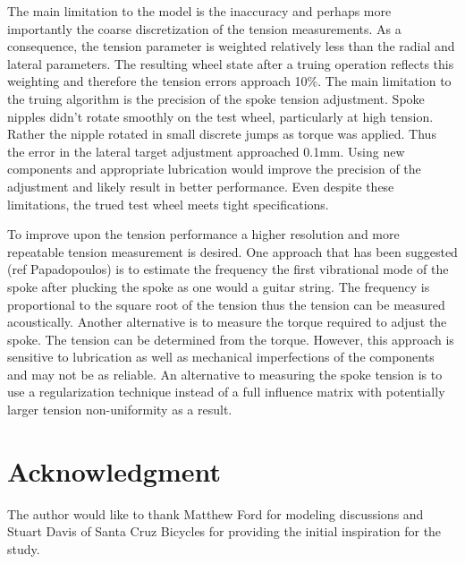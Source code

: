 \documentclass[journal]{IEEEtran}
\begin{document}
The main limitation to the model is the inaccuracy and perhaps more importantly the coarse discretization of the tension measurements.  As a consequence, the tension parameter is weighted relatively less than the radial and lateral parameters.  The resulting wheel state after a truing operation reflects this weighting and therefore the tension errors approach 10\%. The main limitation to the truing algorithm is the precision of the spoke tension adjustment. Spoke nipples didn't rotate smoothly on the test wheel, particularly at high tension.  Rather the nipple rotated in small discrete jumps as torque was applied.  Thus the error in the lateral target adjustment approached 0.1mm.  Using new components and appropriate lubrication would improve the precision of the adjustment and likely result in better performance.  Even despite these limitations, the trued test wheel meets tight specifications.

To improve upon the tension performance a higher resolution and more repeatable tension measurement is desired. One approach that has been suggested (ref Papadopoulos) is to estimate the frequency the first vibrational mode of the spoke after plucking the spoke as one would a guitar string.  The frequency is proportional to the square root of the tension thus the tension can be measured acoustically.  Another alternative is to measure the torque required to adjust the spoke. The tension can be determined from the torque. However, this approach is sensitive to lubrication as well as mechanical imperfections of the components and may not be as reliable. An alternative to measuring the spoke tension is to use a regularization technique instead of a full influence matrix with potentially larger tension non-uniformity as a result. 


\section*{Acknowledgment}
The author would like to thank Matthew Ford for modeling discussions and Stuart Davis of Santa Cruz Bicycles for providing the initial inspiration for the study.

\ifCLASSOPTIONcaptionsoff
  \newpage
\fi

\end{document}
